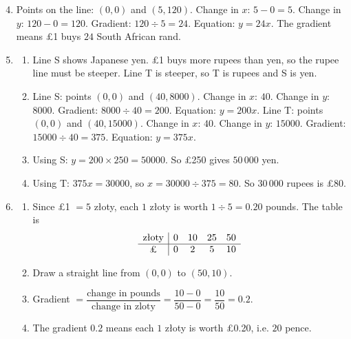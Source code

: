 \documentclass[12pt,a4paper]{article}
\newcommand{\zl}{z\l{}oty}
\newcommand{\heading}[1]{\vspace{8pt}{\large\bfseries #1}\par\vspace{2pt}}
\begin{document}
\heading{Part 2: Measuring steepness with the gradient}

\begin{enumerate}[label=\textbf{Q\arabic*.}, leftmargin=*]
\setcounter{enumi}{3}
\item Points on the line: \((0,0)\) and \((5,120)\). Change in \(x\): \(5-0=5\). Change in \(y\): \(120-0=120\). Gradient: \(120\div5=24\). Equation: \(y=24x\). The gradient means \pounds1 buys \(24\) South African rand.

\item
\begin{enumerate}
\item Line S shows Japanese yen. \pounds1 buys more rupees than yen, so the rupee line must be steeper. Line T is steeper, so T is rupees and S is yen.
\item Line S: points \((0,0)\) and \((40,8000)\). Change in \(x\): \(40\). Change in \(y\): \(8000\). Gradient: \(8000\div40=200\). Equation: \(y=200x\). Line T: points \((0,0)\) and \((40,15000)\). Change in \(x\): \(40\). Change in \(y\): \(15000\). Gradient: \(15000\div40=375\). Equation: \(y=375x\).
\item Using S: \(y=200\times250=50000\). So \pounds250 gives \(50\,000\) yen.
\item Using T: \(375x=30000\), so \(x=30000\div375=80\). So \(30\,000\) rupees is \pounds80.
\end{enumerate}

\item
\begin{enumerate}
\item Since \pounds1 \(=5\) \zl{}, each \(1\) \zl{} is worth \(1\div5=0.20\) pounds. The table is
\[
\begin{array}{c|cccc}
\text{\zl{}} & 0 & 10 & 25 & 50\\
\hline
\text{\pounds} & 0 & 2 & 5 & 10
\end{array}
\]
\item Draw a straight line from \((0,0)\) to \((50,10)\).
\item Gradient \(=\dfrac{\text{change in pounds}}{\text{change in zloty}}=\dfrac{10-0}{50-0}=\dfrac{10}{50}=0.2\).
\item The gradient \(0.2\) means each \(1\) \zl{} is worth \pounds0.20, i.e. \(20\) pence.
\end{enumerate}
\end{enumerate}

\heading{Part 3: Flat fees and the y-intercept}
\end{document}
